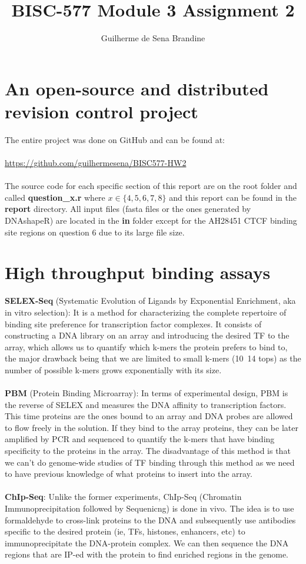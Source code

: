 \documentclass[11pt]{article}
\title{BISC-577 Module 3 Assignment 2}
\author{Guilherme de Sena Brandine}
\begin{document}
\maketitle

\section{An open-source and distributed revision control project}
The entire project was done on GitHub and can be found at:\\
\\
\href{https://github.com/guilhermesena/BISC577-HW2}{https://github.com/guilhermesena/BISC577-HW2} \\
\\
The source code for each specific section of this report are on the root folder and called \textbf{question\_x.r} where $x \in \{ 4,5,6,7,8 \}$ and this report can be found in the \textbf{report} directory. All input files (fasta files or the ones generated by DNAshapeR) are located in the \textbf{in} folder except for the AH28451 CTCF binding site regions on question 6 due to its large file size. 


\section{High throughput binding assays}
\textbf{SELEX-Seq} (Systematic Evolution of Ligands by Exponential Enrichment, aka in vitro selection): It is a method for characterizing the complete repertoire of binding site preference for transcription factor complexes. It consists of constructing a DNA library on an array and introducing the desired TF to the array, which allows us to quantify which k-mers the protein prefers to bind to, the major drawback being that we are limited to small k-mers (10~14 tops) as the number of possible k-mers grows exponentially with its size.\\
\\
\textbf{PBM} (Protein Binding Microarray): In terms of experimental design, PBM is the reverse of SELEX and measures the DNA affinity to transcription factors. This time proteins are the ones bound to an array and DNA probes are allowed to flow freely in the solution. If they bind to the array proteins, they can be later amplified by PCR and sequenced to quantify the k-mers that have binding specificity to the proteins in the array. The disadvantage of this method is that we can't do genome-wide studies of TF binding through this method as we need to have previous knowledge of what proteins to insert into the array. \\
\\
\textbf{ChIp-Seq}: Unlike the former experiments, ChIp-Seq (Chromatin Immunoprecipitation followed by Sequenicng) is done in vivo. The idea is to use formaldehyde to cross-link proteins to the DNA and subsequently use antibodies specific to the desired protein (ie, TFs, histones, enhancers, etc) to immunoprecipitate the DNA-protein complex. We can then sequence the DNA regions that are IP-ed with the protein to find enriched regions in the genome. \\
\end{document}

